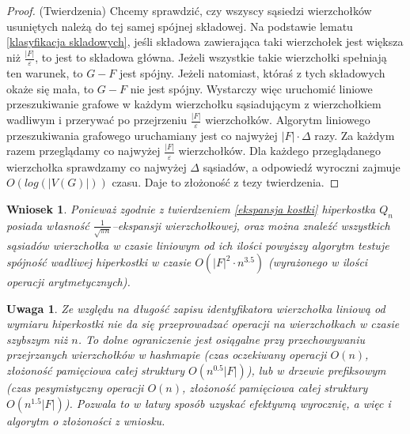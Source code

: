 \documentclass{pracamgr}
\newtheorem{remark}[theorem]{Uwaga}
\newtheorem{corollary}[theorem]{Wniosek}
\begin{document}
    \begin{proof}
     (Twierdzenia)\newline
     Chcemy sprawdzić, czy wszyscy sąsiedzi wierzchołków usuniętych należą do tej samej spójnej składowej. Na podstawie lematu \ref{klasyfikacja skladowych},
     jeśli składowa zawierająca taki wierzchołek jest większa niż $\frac{|F|}{\varepsilon}$, to jest to składowa główna.
     Jeżeli wszystkie takie wierzchołki spełniają ten warunek, to $G-F$ jest spójny.
     Jeżeli natomiast, któraś z tych składowych okaże się mała, to $G-F$ nie jest spójny.\newline
     Wystarczy więc uruchomić liniowe przeszukiwanie grafowe w każdym wierzchołku sąsiadującym z wierzchołkiem wadliwym i przerywać po przejrzeniu
     $\frac{|F|}{\varepsilon}$ wierzchołków.\newline
     Algorytm liniowego przeszukiwania grafowego uruchamiany jest co najwyżej $|F|\cdot\Delta$ razy.
     Za każdym razem przeglądamy co najwyżej $\frac{|F|}{\varepsilon}$ wierzchołków.
     Dla każdego przeglądanego wierzchołka sprawdzamy co najwyżej $\Delta$ sąsiadów, a odpowiedź wyroczni zajmuje $O(log(|V(G)|))$ czasu.
     Daje to złożoność z tezy twierdzenia.
    \end{proof}
    \begin{corollary}\label{ekspansywna spojnosc dla kostki}
     Ponieważ zgodnie z twierdzeniem \ref{ekspansja kostki} hiperkostka $Q_n$ posiada własność\newline
     $\frac{1}{\sqrt{\pi n}}$--ekspansji wierzchołkowej,
     oraz można znaleźć wszystkich sąsiadów wierzchołka w czasie liniowym od ich ilości powyższy algorytm testuje spójność wadliwej hiperkostki w czasie
     ${O(|F|^2\cdot n^{3.5})}$ (wyrażonego w ilości operacji arytmetycznych).
    \end{corollary}
    \begin{remark}\label{prawdziwa zlozoność ekspansywnej}
     Ze względu na długość zapisu identyfikatora wierzchołka liniową od wymiaru hiperkostki nie da się przeprowadzać operacji na wierzchołkach w czasie szybszym niż
     $n$. To dolne ograniczenie jest osiągalne przy przechowywaniu przejrzanych wierzchołków w hashmapie
     (czas oczekiwany operacji $O(n)$, złożoność pamięciowa całej struktury $O(n^{0.5}|F|)$),
     lub w drzewie prefiksowym (czas pesymistyczny operacji $O(n)$, złożoność pamięciowa całej struktury $O(n^{1.5}|F|)$).
     Pozwala to w łatwy sposób uzyskać efektywną wyrocznię, a więc i algorytm o złożoności z wniosku.
    \end{remark}
\end{document}
